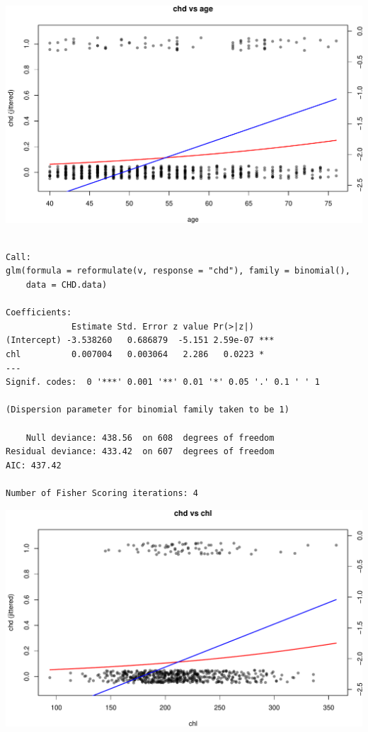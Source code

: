 \documentclass[
  letterpaper,
]{scrbook}
\begin{document}
\includegraphics{unit4-lr/logistic_files/figure-pdf/chd-univariate-2x2-jitter-fixedlogit-3.pdf}

\begin{verbatim}

Call:
glm(formula = reformulate(v, response = "chd"), family = binomial(), 
    data = CHD.data)

Coefficients:
             Estimate Std. Error z value Pr(>|z|)    
(Intercept) -3.538260   0.686879  -5.151 2.59e-07 ***
chl          0.007004   0.003064   2.286   0.0223 *  
---
Signif. codes:  0 '***' 0.001 '**' 0.01 '*' 0.05 '.' 0.1 ' ' 1

(Dispersion parameter for binomial family taken to be 1)

    Null deviance: 438.56  on 608  degrees of freedom
Residual deviance: 433.42  on 607  degrees of freedom
AIC: 437.42

Number of Fisher Scoring iterations: 4
\end{verbatim}

\includegraphics{unit4-lr/logistic_files/figure-pdf/chd-univariate-2x2-jitter-fixedlogit-4.pdf}
\end{document}
